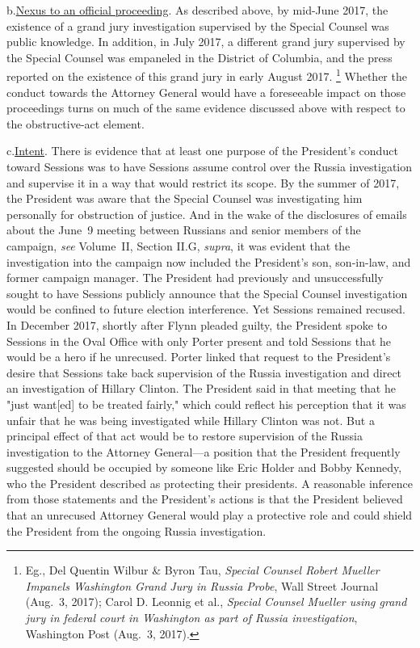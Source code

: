 b.\qquad\underline{Nexus to an official proceeding}.
As described above, by mid-June 2017, the existence of a grand jury investigation supervised by the Special Counsel was public knowledge.
In addition, in July 2017, a different grand jury supervised by the Special Counsel was empaneled in the District of Columbia, and the press reported on the existence of this grand jury in early August 2017.%
\footnote{Eg., Del Quentin Wilbur \& Byron Tau, \textit{Special Counsel Robert Mueller Impanels Washington Grand Jury in Russia Probe}, Wall Street Journal (Aug.~3, 2017);
Carol D. Leonnig et al., \textit{Special Counsel Mueller using grand jury in federal court in Washington as part of Russia investigation}, Washington Post (Aug.~3, 2017).}
Whether the conduct towards the Attorney General would have a foreseeable impact on those proceedings turns on much of the same evidence discussed above with respect to the obstructive-act element.

c.\qquad\underline{Intent}.
There is evidence that at least one purpose of the President's conduct toward Sessions was to have Sessions assume control over the Russia investigation and supervise it in a way that would restrict its scope.
By the summer of 2017, the President was aware that the Special Counsel was investigating him personally for obstruction of justice.
And in the wake of the disclosures of emails about the June~9 meeting between Russians and senior members of the campaign, \textit{see} Volume~II, Section II.G, \textit{supra}, it was evident that the investigation into the campaign now included the President's son, son-in-law, and former campaign manager.
The President had previously and unsuccessfully sought to have Sessions publicly announce that the Special Counsel investigation would be confined to future election interference.
Yet Sessions remained recused.
In December 2017, shortly after Flynn pleaded guilty, the President spoke to Sessions in the Oval Office with only Porter present and told Sessions that he would be a hero if he unrecused.
Porter linked that request to the President's desire that Sessions take back supervision of the Russia investigation and direct an investigation of Hillary Clinton.
The President said in that meeting that he "just want[ed] to be treated fairly," which could reflect his perception that it was unfair that he was being investigated while Hillary Clinton was not.
But a principal effect of that act would be to restore supervision of the Russia investigation to the
Attorney General---a position that the President frequently suggested should be occupied by someone like Eric Holder and Bobby Kennedy, who the President described as protecting their presidents.
A reasonable inference from those statements and the President's actions is that the President believed that an unrecused Attorney General would play a protective role and could shield the President from the ongoing Russia investigation.

